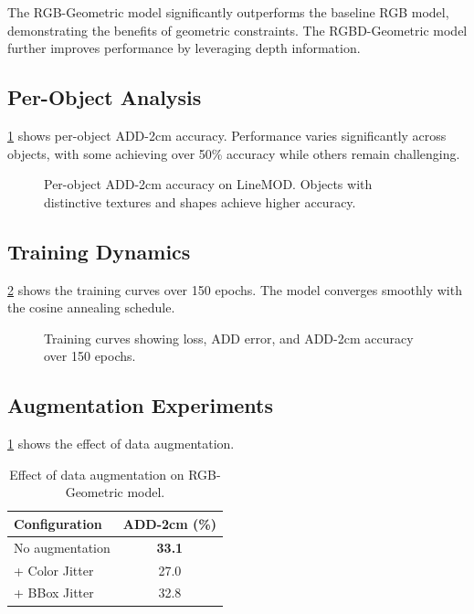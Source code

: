 The RGB-Geometric model significantly outperforms the baseline RGB model, demonstrating the benefits of geometric constraints. The RGBD-Geometric model further improves performance by leveraging depth information.

\subsection{Per-Object Analysis}

\cref{fig:per_object} shows per-object ADD-2cm accuracy. Performance varies significantly across objects, with some achieving over 50\% accuracy while others remain challenging.

\begin{figure}[h]
\centering
{}
\caption{Per-object ADD-2cm accuracy on LineMOD. Objects with distinctive textures and shapes achieve higher accuracy.}
\label{fig:per_object}
\end{figure}

\subsection{Training Dynamics}

\cref{fig:training_curves} shows the training curves over 150 epochs. The model converges smoothly with the cosine annealing schedule.

\begin{figure}[h]
\centering
{}
\caption{Training curves showing loss, ADD error, and ADD-2cm accuracy over 150 epochs.}
\label{fig:training_curves}
\end{figure}

\subsection{Augmentation Experiments}

\cref{tab:augmentation} shows the effect of data augmentation.

\begin{table}[h]
\centering
\caption{Effect of data augmentation on RGB-Geometric model.}
\label{tab:augmentation}
\begin{tabular}{lc}
\toprule
Configuration & ADD-2cm (\%) \\
\midrule
No augmentation & \textbf{33.1} \\
+ Color Jitter & 27.0 \\
+ BBox Jitter & 32.8 \\
\bottomrule
\end{tabular}
\end{table}

